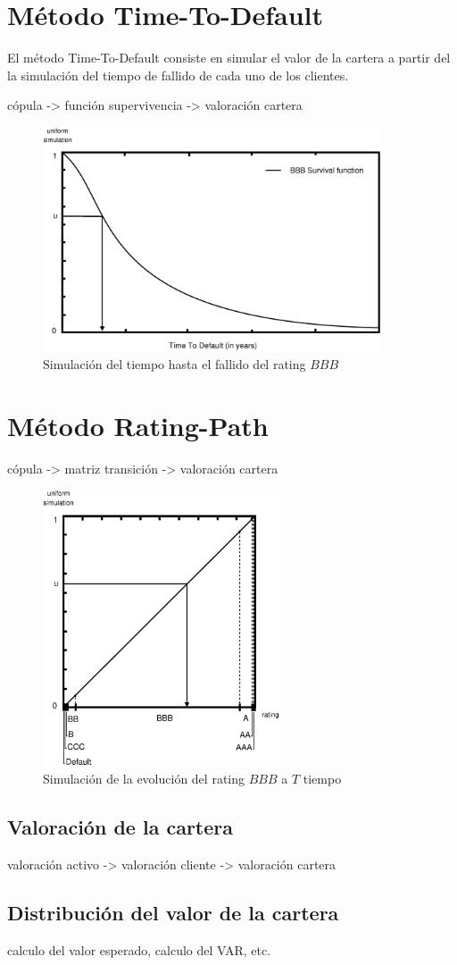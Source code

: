 \section{M\'etodo Time-To-Default}


El m\'etodo Time-To-Default consiste en simular el valor de la cartera a partir 
del la simulaci\'on del tiempo de fallido de cada uno de los clientes.

c\'opula -> funci\'on supervivencia -> valoraci\'on cartera

\begin{figure}[!hb]
\begin{center}
\includegraphics[width=10cm,angle=0]{./images/simttd.eps}
\caption{Simulaci\'on del tiempo hasta el fallido del rating $BBB$}
\label{simttd}
\end{center}
\end{figure}


\section{M\'etodo Rating-Path}
c\'opula -> matriz transici\'on -> valoraci\'on cartera

\begin{figure}[!hb]
\begin{center}
\includegraphics[width=7cm,angle=0]{./images/simrp.eps}
\caption{Simulaci\'on de la evoluci\'on del rating $BBB$ a $T$ tiempo}
\label{simrp}
\end{center}
\end{figure}


\subsection{Valoraci\'on de la cartera}
valoraci\'on activo -> valoraci\'on cliente -> valoraci\'on cartera

\subsection{Distribuci\'on del valor de la cartera}
calculo del valor esperado, calculo del VAR, etc.

